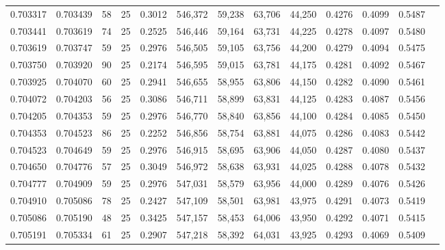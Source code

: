 \begin{tabular}{rrrrrrrrrrrrr}
0.703317 & 0.703439 &    58 &  25 &                                     0.3012 & 546,372 &  59,238 &  63,706 &  44,250 & 0.4276 & 0.4099 & 0.5487 \\
0.703441 & 0.703619 &    74 &  25 &                                     0.2525 & 546,446 &  59,164 &  63,731 &  44,225 & 0.4278 & 0.4097 & 0.5480 \\
0.703619 & 0.703747 &    59 &  25 &                                     0.2976 & 546,505 &  59,105 &  63,756 &  44,200 & 0.4279 & 0.4094 & 0.5475 \\
0.703750 & 0.703920 &    90 &  25 &                                     0.2174 & 546,595 &  59,015 &  63,781 &  44,175 & 0.4281 & 0.4092 & 0.5467 \\
0.703925 & 0.704070 &    60 &  25 &                                     0.2941 & 546,655 &  58,955 &  63,806 &  44,150 & 0.4282 & 0.4090 & 0.5461 \\
0.704072 & 0.704203 &    56 &  25 &                                     0.3086 & 546,711 &  58,899 &  63,831 &  44,125 & 0.4283 & 0.4087 & 0.5456 \\
0.704205 & 0.704353 &    59 &  25 &                                     0.2976 & 546,770 &  58,840 &  63,856 &  44,100 & 0.4284 & 0.4085 & 0.5450 \\
0.704353 & 0.704523 &    86 &  25 &                                     0.2252 & 546,856 &  58,754 &  63,881 &  44,075 & 0.4286 & 0.4083 & 0.5442 \\
0.704523 & 0.704649 &    59 &  25 &                                     0.2976 & 546,915 &  58,695 &  63,906 &  44,050 & 0.4287 & 0.4080 & 0.5437 \\
0.704650 & 0.704776 &    57 &  25 &                                     0.3049 & 546,972 &  58,638 &  63,931 &  44,025 & 0.4288 & 0.4078 & 0.5432 \\
0.704777 & 0.704909 &    59 &  25 &                                     0.2976 & 547,031 &  58,579 &  63,956 &  44,000 & 0.4289 & 0.4076 & 0.5426 \\
0.704910 & 0.705086 &    78 &  25 &                                     0.2427 & 547,109 &  58,501 &  63,981 &  43,975 & 0.4291 & 0.4073 & 0.5419 \\
0.705086 & 0.705190 &    48 &  25 &                                     0.3425 & 547,157 &  58,453 &  64,006 &  43,950 & 0.4292 & 0.4071 & 0.5415 \\
0.705191 & 0.705334 &    61 &  25 &                                     0.2907 & 547,218 &  58,392 &  64,031 &  43,925 & 0.4293 & 0.4069 & 0.5409 \\

\end{tabular}
